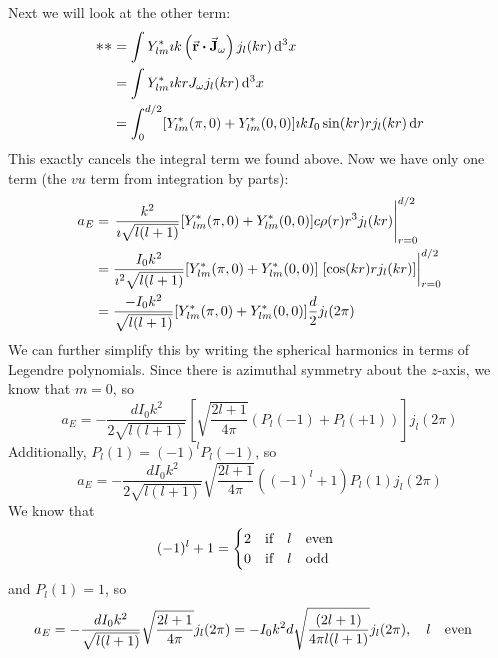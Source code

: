 \documentclass[a4paper,twoside]{article}
\begin{document}
\begin{itemize}
\begin{problem}
            Next we will look at the other term:
            \begin{align}
                \mathlarger{\ast\ast} &= \int Y_{lm}^* \imath k \left( \va{r} \vdot \va{J}_{\omega} \right) j_l(kr) \dd[3]{x} \\
                &= \int Y_{lm}^* \imath k r J_{\omega} j_l(kr) \dd[3]{x} \\
                &= \int_{0}^{d/2} [Y_{lm}^*(\pi,0) + Y_{lm}^*(0,0)] \imath k I_0 \sin(kr) r j_l(kr) \dd{r}
            \end{align}
            This exactly cancels the integral term we found above. Now we have only one term (the $ v u $ term from integration by parts):
            \begin{align}
                a_E &= \eval{\frac{k^2}{\imath \sqrt{l(l+1)}} [Y_{lm}^*(\pi,0) + Y_{lm}^*(0,0)] c \rho(r) r^3 j_l(kr)}_{r = 0}^{d/2} \\
                &= \frac{ I_0 k^2}{\imath^2\sqrt{l(l+1)}} [Y_{lm}^*(\pi,0) + Y_{lm}^*(0,0)]\eval{[\cos(kr) r j_l(kr)]}_{r=0}^{d/2} \\
                &= \frac{- I_0 k^2}{\sqrt{l(l+1)}} [Y_{lm}^*(\pi,0) + Y_{lm}^*(0,0)] \frac{d}{2} j_l(2 \pi)
            \end{align}
            We can further simplify this by writing the spherical harmonics in terms of Legendre polynomials. Since there is azimuthal symmetry about the $ z $-axis, we know that $ m = 0 $, so
            \begin{equation}
                a_E = - \frac{d I_0 k^2}{2\sqrt{l(l+1)}} \left[ \sqrt{\frac{2 l + 1}{4 \pi}}( P_{l}(-1) + P_{l}(+1)) \right] j_l(2 \pi)
            \end{equation}
            Additionally, $ P_l(1) = (-1)^l P_l(-1) $, so
            \begin{equation}
                a_E = - \frac{d I_0 k^2}{2\sqrt{l(l+1)}} \sqrt{\frac{2l+1}{4 \pi}} \left( (-1)^l + 1 \right) P_l(1) j_l(2 \pi)
            \end{equation}
            We know that
            \begin{equation}
                (-1)^l + 1 = \begin{cases} 2 \qif l \qeven \\ 0 \qif l \qodd \end{cases}
            \end{equation}
            and $ P_l(1) = 1 $, so
            \begin{equation}
                a_E = - \frac{d I_0 k^2}{\sqrt{l(l+1)}} \sqrt{\frac{2l+1}{4 \pi}} j_l(2 \pi) = - I_0 k^2 d \sqrt{\frac{(2l+1)}{4 \pi l(l+1)}} j_l(2 \pi) \qc l \qeven 

\end{equation}
\end{problem}
\end{itemize}
\end{document}
